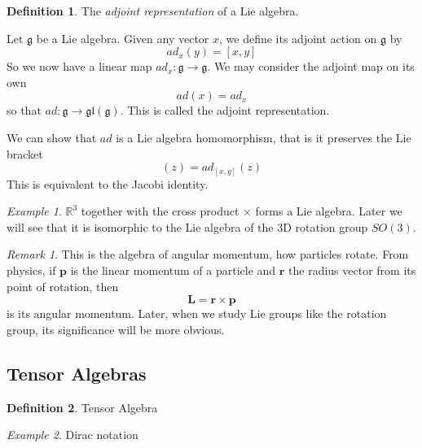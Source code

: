 \documentclass[12pt]{article}
\theoremstyle{definition}
\newtheorem{definition}{Definition}[section]
\theoremstyle{remark}
\newtheorem*{remark}{Remark}
\theoremstyle{example}
\newtheorem{example}{Example}
\def\b#1{\textbf{#1}}
\begin{document}
\begin{definition}
	The \textit{adjoint representation} of a Lie algebra.
	
	Let $\mathfrak{g}$ be a Lie algebra. Given any vector $x$, we define its adjoint action on $\mathfrak{g}$ by
	\begin{equation}
		ad_{x}(y)=[x,y]
	\end{equation}
	So we now have a linear map $ad_x:\mathfrak{g}\to\mathfrak{g}$. We may consider the adjoint map on its own
	\begin{equation}
		ad(x)=ad_x
	\end{equation}
	so that $ad:\mathfrak{g}\to\mathfrak{gl}(\mathfrak{g})$. This is called the adjoint representation.
	
	We can show that $ad$ is a Lie algebra homomorphism, that is it preserves the Lie bracket
	\begin{equation}
		[ad_x,ad_y](z)=ad_{[x,y]}(z)
	\end{equation}
	This is equivalent to the Jacobi identity.
\end{definition}

\begin{example}
	$\mathbb{R}^3$ together with the cross product $\times$ forms a Lie algebra. Later we will see that it is isomorphic to the Lie algebra of the 3D rotation group $SO(3)$.
\end{example}

\begin{remark}
	This is the algebra of angular momentum, how particles rotate. From physics, if $\b{p}$ is the linear momentum of a particle and $\b{r}$ the radius vector from its point of rotation, then 
	\begin{equation}
		\b{L}=\b{r}\times\b{p}
	\end{equation}
	is its angular momentum. Later, when we study Lie groups like the rotation group, its significance will be more obvious.
\end{remark}

\subsection{Tensor Algebras}

\begin{definition}
	Tensor Algebra
\end{definition}

\begin{example}
	Dirac notation
\end{example}
\end{document}
